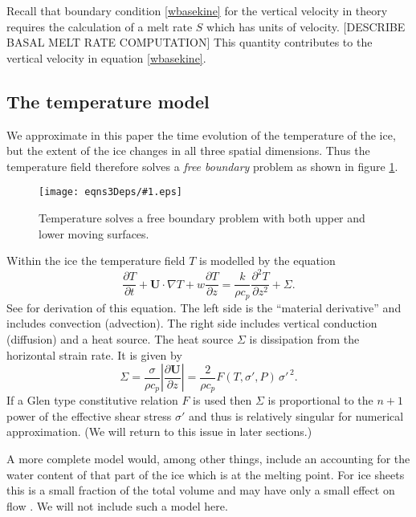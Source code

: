 \documentclass{amsart}%
\theoremstyle{plain}
\theoremstyle{definition}
\theoremstyle{remark}
\newcommand{\regfigure}[2]{\texttt{[image: eqns3Deps/\#1.eps]}}
\newcommand{\ddt}[1]{\ensuremath{\frac{\partial #1}{\partial t}}}
\newcommand{\ddz}[1]{\ensuremath{\frac{\partial #1}{\partial z}}}
\newcommand{\dddzdz}[1]{\ensuremath{\frac{\partial^2 #1}{\partial z^2}}}
\newcommand{\grad}{\nabla}
\newcommand{\bU}{{\mathbf{U}}}
\begin{document}
Recall that boundary condition \eqref{wbasekine} for the vertical velocity in theory requires the calculation of a melt rate $S$ which has units of velocity.  [DESCRIBE BASAL MELT RATE COMPUTATION]
This quantity contributes to the vertical velocity in equation \eqref{wbasekine}.


\subsection{The temperature model}\label{ss:temp}   We approximate in this paper the time evolution of the temperature of the ice, but the extent of the ice changes in all three spatial dimensions.  Thus the temperature field therefore solves a \emph{free boundary} problem as shown in figure \ref{tempbdry}.

\begin{figure}[ht]
\vspace{-3mm}
\regfigure{tempbdryfig}{3}
\vspace{-6mm}
\caption{Temperature solves a free boundary problem with both upper and lower moving surfaces.}
\label{tempbdry}
\end{figure}

Within the ice the temperature field $T$ is modelled by the equation
\begin{equation}\label{Teqn}
\ddt{T} + \bU\cdot \grad T + w \ddz{T} = \frac{k}{\rho c_p} \dddzdz{T}+ \Sigma.
\end{equation}
See \cite{Fowler,Paterson,vanderVeen} for derivation of this equation.  The left side is the ``material derivative'' and includes convection (advection).  The right side includes vertical conduction (diffusion) and a heat source.  The heat source $\Sigma$ is dissipation from the horizontal strain rate.  It is given by \cite{Paterson}
    $$\Sigma = \frac{\sigma}{\rho c_p} \left|\ddz{\bU}\right| = \frac{2}{\rho c_p} F(T,\sigma',P) \, \sigma'^{\,2}.$$
If a Glen type constitutive relation $F$ is used then $\Sigma$ is proportional to the $n+1$ power of the effective shear stress $\sigma'$ and thus is relatively singular for numerical approximation.   (We will return to this issue in later sections.)

A more complete model would, among other things,  include an accounting for the water content of that part of the ice which is at the melting point.  For ice sheets this is a small fraction of the total volume and may have only a small effect on flow \cite{Greve}.  We will not include such a model here.
\end{document}
